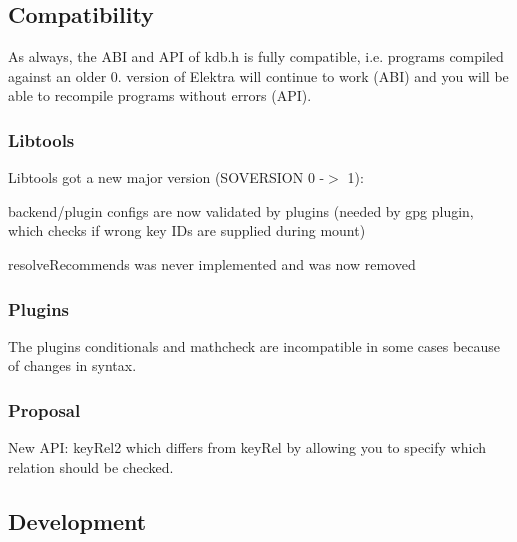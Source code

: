\subsection*{Compatibility}

As always, the A\+BI and A\+PI of kdb.\+h is fully compatible, i.\+e. programs compiled against an older 0. version of Elektra will continue to work (A\+BI) and you will be able to recompile programs without errors (A\+PI).

\subsubsection*{Libtools}

Libtools got a new major version (S\+O\+V\+E\+R\+S\+I\+ON 0 -\/$>$ 1)\+:


\begin{DoxyItemize}
\item backend/plugin configs are now validated by plugins (needed by gpg plugin, which checks if wrong key I\+Ds are supplied during mount)
\item resolve\+Recommends was never implemented and was now removed
\end{DoxyItemize}

\subsubsection*{Plugins}

The plugins conditionals and mathcheck are incompatible in some cases because of changes in syntax.

\subsubsection*{Proposal}

New A\+PI\+: {\ttfamily key\+Rel2} which differs from {\ttfamily key\+Rel} by allowing you to specify which relation should be checked.

\subsection*{Development}


